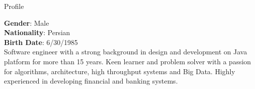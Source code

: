
\begin{jrsection}[location = sidebar]{Profile}
    \begin{jrdescription}
        {\bfseries Gender}: Male \\
        {\bfseries Nationality}: Persian \\
        {\bfseries Birth Date}: 6/30/1985 \\
        Software engineer with a strong background in design and development on Java platform for more than 15 years.
        Keen learner and problem solver with a passion for algorithms, architecture, high throughput systems and Big Data.
        Highly experienced in developing financial and banking systems.
    \end{jrdescription}
\end{jrsection}
